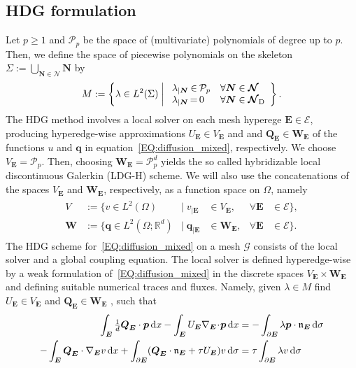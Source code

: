 \documentclass[a4paper, english, 12pt, reqno, draft]{amsart}
\theoremstyle{definition}
\theoremstyle{remark}
\numberwithin{equation}{section}
\newcommand{\Graph}{\ensuremath{\boldsymbol{\mathcal G}}}
\newcommand{\SetEdge}{\ensuremath{\boldsymbol{\mathcal E}}}
\newcommand{\SetNode}{\ensuremath{\boldsymbol{\mathcal N}}}
\newcommand{\SetNodeDir}{\ensuremath{\SetNode_\textup D}}
\newcommand{\Edge}{{\ensuremath{\boldsymbol E}}}
\newcommand{\Node}{{\ensuremath{\boldsymbol N}}}
\newcommand{\Nabla}{\ensuremath{\nabla_\Edge}}
\newcommand{\Div}{\ensuremath{\Nabla\!\cdot\!}}
\newcommand{\Normal}{\ensuremath{\mathfrak n_\Edge}}
\newcommand{\skeletal}{\ensuremath{\Sigma}}
\newcommand{\skeletalSpace}{\ensuremath{M}}
\newcommand{\discElementSpace}{\ensuremath{V}}
\newcommand{\polynomials}{\ensuremath{\mathcal P}}
\renewcommand{\vec}[1]{\ensuremath{\boldsymbol{#1}}}
\newcommand{\dx}{\ensuremath{\, \textup d x}}
\newcommand{\ds}{\ensuremath{\, \textup d \sigma}}
\begin{document}
\subsection{HDG formulation}\label{SEC:HDG_form}
% 
Let $p\ge 1$ and $\polynomials_p$ be the space of (multivariate)
polynomials of degree up to $p$. Then, we define the space of piecewise polynomials on the skeleton $\skeletal := \bigcup_{\Node \in \SetNode} \Node$ by
% 
\begin{gather}\label{EQ:skeletal_space}
 \skeletalSpace := \left\{ \lambda \in L^2(\skeletal) \;\middle|\;
 \begin{array}{r@{\,}c@{\,}ll}
  \lambda_{|\Node} &\in& \polynomials_p & \forall \Node \in \SetNode\\
  \lambda_{|\Node} &=& 0 & \forall \Node \in \SetNodeDir    
 \end{array}
 \right\}.
\end{gather}
% 
The HDG method involves a local solver on each mesh hyperege
$\Edge \in \SetEdge$, producing hyperedge-wise approximations $U_\Edge \in V_\Edge$ and and $\vec Q_\Edge \in \vec W_\Edge$ of the functions $u$ and $\vec q$ in equation~\eqref{EQ:diffusion_mixed}, respectively. We choose $V_\Edge = \polynomials_p$. Then, choosing
$\vec W_\Edge = \polynomials_p^d$ yields the so called hybridizable local discontinuous Galerkin (LDG-H) scheme. We will also use the concatenations of the spaces $V_\Edge$ and $\vec W_\Edge$, respectively, as a function space on $\Omega$, namely
\begin{gather}\label{EQ:dg_spaces}
 \begin{aligned}
  \discElementSpace &:=\bigl\{ v \in L^2(\Omega) & \big|\;v_{|\Edge} &\in V_\Edge, &\forall \Edge &\in \SetEdge \bigr\},\\
  \vec W &:=\bigl\{ \vec q \in L^2(\Omega;\mathbb R^d) & \big|\;\vec q_{|\Edge} &\in \vec W_\Edge, &\forall \Edge &\in \SetEdge \bigr\}.
 \end{aligned}
\end{gather}
% 
The HDG scheme for~\eqref{EQ:diffusion_mixed} on a mesh $\Graph$
consists of the local solver and a global coupling equation. The local solver is defined hyperedge-wise by a weak formulation
of~\eqref{EQ:diffusion_mixed} in the discrete spaces
$V_\Edge \times \vec W_\Edge$ and defining suitable numerical traces and fluxes. Namely, given $\lambda \in \skeletalSpace$ find $U_\Edge \in V_\Edge$ and $\vec Q_\Edge \in \vec W_\Edge$ , such that
% 
\begin{subequations}\label{EQ:hdg_scheme}
 \begin{align}
  \int_\Edge \tfrac{1}{d} \vec Q_\Edge \cdot \vec p \dx - \int_\Edge U_\Edge \Div \vec p \dx & = - \int_{\partial \Edge} \lambda \vec p \cdot \Normal \ds \label{EQ:hdg_primary}\\
  - \int_\Edge \vec Q_\Edge \cdot \Nabla v \dx  + \int_{\partial \Edge} ( \vec Q_\Edge \cdot \Normal + \tau  U_\Edge ) v \ds
  & = \tau \int_{\partial \Edge} \lambda v \ds \label{EQ:hdg_flux}
 \end{align}
\end{subequations}
\end{document}
